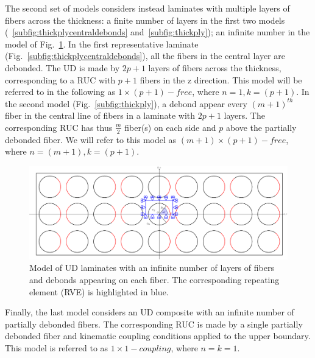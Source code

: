 \documentclass[review]{elsarticle}
\begin{document}
The second set of models considers instead laminates with multiple layers of fibers across the thickness: a finite number of layers in the first two models (~\ref{subfig:thickplycentraldebonds} and~\ref{subfig:thickply}); an infinite number in the model of Fig.~\ref{fig:thickplyalldebonds}. In the first representative laminate (Fig.~\ref{subfig:thickplycentraldebonds}), all the fibers in the central layer are debonded. The UD is made by $2p+1$ layers of fibers across the thickness, corresponding to a RUC with $p+1$ fibers in the z direction. This model will be referred to in the following as $1\times\left(p+1\right)-free$, where $n=1,k=\left(p+1\right)$. In the second model (Fig.~\ref{subfig:thickply}), a debond appear every $\left(m+1\right)^{th}$ fiber in the central line of fibers in a laminate with $2p+1$ layers. The corresponding RUC has thus $\frac{m}{2}$ fiber(s) on each side and $p$ above the partially debonded fiber. We will refer to this model as $\left(m+1\right)\times\left(p+1\right)-free$, where $n=\left(m+1\right), k=\left(p+1\right)$.

\begin{figure}[!h]
\centering
\includegraphics[width=\textwidth]{thickPlyAllDebonds.pdf}
\caption{Model of UD laminates with an infinite number of  layers of fibers and debonds appearing on each fiber. The corresponding repeating element (RVE) is highlighted in blue.}\label{fig:thickplyalldebonds}
\end{figure}

Finally, the last model considers an UD composite with an infinite number of partially debonded fibers. The corresponding RUC is made by a single partially debonded fiber and kinematic coupling conditions applied to the upper boundary. This model is referred to as $1\times 1-coupling$, where $n=k=1$.
\end{document}

